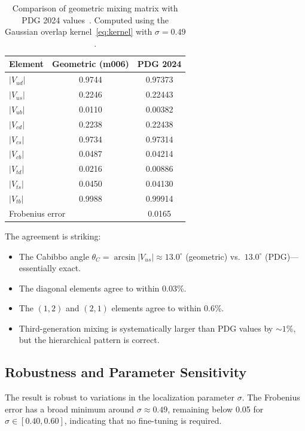 \documentclass[11pt,a4paper]{article}
\begin{document}
\begin{table}[h]
\centering
\begin{tabular}{lcc}
\toprule
Element & Geometric (m006) & PDG 2024 \\
\midrule
$|V_{ud}|$ & 0.9744 & 0.97373 \\
$|V_{us}|$ & 0.2246 & 0.22443 \\
$|V_{ub}|$ & 0.0110 & 0.00382 \\
$|V_{cd}|$ & 0.2238 & 0.22438 \\
$|V_{cs}|$ & 0.9734 & 0.97314 \\
$|V_{cb}|$ & 0.0487 & 0.04214 \\
$|V_{td}|$ & 0.0216 & 0.00886 \\
$|V_{ts}|$ & 0.0450 & 0.04130 \\
$|V_{tb}|$ & 0.9988 & 0.99914 \\
\midrule
\multicolumn{2}{l}{Frobenius error} & 0.0165 \\
\bottomrule
\end{tabular}
\caption{Comparison of geometric mixing matrix with PDG 2024 values~\cite{PDG2024}. Computed using the Gaussian overlap kernel~\eqref{eq:kernel} with $\sigma = 0.49$.}
\label{tab:ckm_comparison}
\end{table}

The agreement is striking:
\begin{itemize}
\item The Cabibbo angle $\theta_C = \arcsin|V_{us}| \approx 13.0^\circ$ 
(geometric) vs.\ $13.0^\circ$ (PDG)---essentially exact.

\item The diagonal elements agree to within 0.03\%.

\item The $(1,2)$ and $(2,1)$ elements agree to within 0.6\%.

\item Third-generation mixing is systematically larger than PDG values 
by $\sim 1$\%, but the hierarchical pattern is correct.
\end{itemize}

\subsection{Robustness and Parameter Sensitivity}
\label{subsec:robustness}

The result is robust to variations in the localization parameter $\sigma$.
The Frobenius error has a broad minimum around $\sigma \approx 0.49$,
remaining below 0.05 for $\sigma \in [0.40, 0.60]$,
indicating that no fine-tuning is required.
\end{document}
